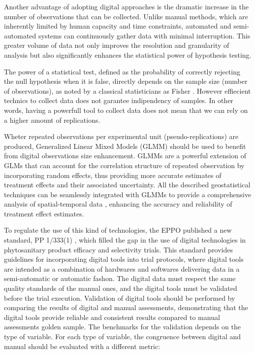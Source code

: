 \documentclass[12pt,a4paper,oneside]{report}
\begin{document}
Another advantage of adopting digital approaches is the
dramatic increase in the number of observations that can be collected. Unlike
manual methods, which are inherently limited by human capacity and time
constraints, automated and semi-automated systems can continuously gather data
with minimal interruption. This greater volume of data not only improves the
resolution and granularity of analysis but also significantly enhances the
statistical power of hypothesis testing.

The power of a statistical test, defined as the probability of correctly
rejecting the null hypothesis when it is false, directly depends on the sample
size (number of observations), as noted by a classical statisticians as
Fisher \cite{fisherStatisticalMethodsResearch1992}. However effiecient technics
to collect data does not garantee indipendency of samples. 
In other words, having a powerfull tool to collect data does not mean that we
can rely on a higher amount of replications.

Wheter repeated observations
per experimental unit (pseudo-replications) are produced, Generalized Linear Mixed Models 
(GLMM) \cite{gburAnalysisGeneralizedLinear2020,kumleEstimatingPowerGeneralized2021}
should be used to benefit from 
digital observations size enhancement. GLMMs are a powerful extension of GLMs that can
account for the correlation structure of repeated observation
by incorporating random effects, thus providing more
accurate estimates of treatment effects and their associated uncertainty.
All the described geostatistical techniques can be seamlessly integrated with GLMMs to
provide a comprehensive analysis of spatial-temporal data
\cite{slaetsLinearMixedModels2021,rodriguez-alvarezCorrectingSpatialHeterogeneity2018}, 
enhancing the accuracy and
reliability of treatment effect estimates.

To regulate the use of this kind of technologies, the EPPO published a new standard, 
PP 1/333(1) \cite{PP1333}, which 
filled the gap in the use of digital technologies in phytosanitary product efficacy
and selectivity trials. This standard provides guidelines for incorporating digital
tools into trial protocols, where digital tools are intended as a combination of
hardwares and softwares delivering data 
in a semi-automatic or automatic fashon.
The digital data must respect the same quality standards of the manual
ones, and the digital tools must be validated before the trial execution.
Validation of digital tools should
be performed by comparing the results of digital and manual assessments, 
demonstrating that the digital tools provide reliable and consistent
results compared to manual assessments golden sample. 
The benchmarks for the validation depends
on the type of variable. For each type of variable, the congruence between 
digital and manual should be evaluated with a different metric:
\end{document}
